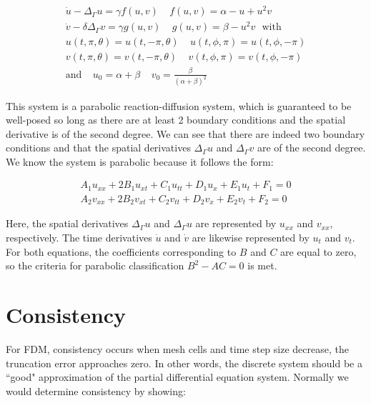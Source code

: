 \documentclass[12pt]{article}
\begin{document}
\begin{equation}
	\begin{aligned}
		\dot{u} - \Delta_\Gamma u = \gamma f(u,v) ~~~~~ f(u,v) = \alpha - u + u^2v ~~~\\
		\dot{v} - \delta\Delta_\Gamma v = \gamma g(u, v) ~~~~~ g(u, v) = \beta - u^2v ~~~ \text{with}\\
		u(t,\pi, \theta) = u(t, -\pi, \theta) ~~~~~ u(t, \phi, \pi) = u(t, \phi, -\pi) \\
		v(t,\pi, \theta) = v(t, -\pi, \theta) ~~~~~ v(t, \phi, \pi) = v(t, \phi, -\pi)	\\
		\text{and} ~~~~~ u_0 = \alpha + \beta ~~~~~ v_0 = \frac{\beta}{(\alpha+\beta)^2}~~~~~~
	\end{aligned}
\end{equation}

This system is a parabolic reaction-diffusion system, which is guaranteed to be well-posed so long as there are at least 2 boundary conditions and the spatial derivative is of the second degree. We can see that there are indeed two boundary conditions and that the spatial derivatives $\Delta_\Gamma u$ and $\Delta_\Gamma v$ are of the second degree. We know the system is parabolic because it follows the form:

\begin{equation}
	\begin{aligned}
		A_1u_{xx} + 2B_1u_{xt} + C_1u_{tt} + D_1u_x + E_1u_t + F_1 = 0 \\
		A_2v_{xx} + 2B_2v_{xt} + C_2v_{tt} + D_2v_x + E_2v_t + F_2 = 0
	\end{aligned}
\end{equation}

Here, the spatial derivatives $\Delta_\Gamma u$ and $\Delta_\Gamma u$ are represented by $u_{xx}$ and $v_{xx}$, respectively. The time derivatives $\dot{u}$ and $\dot{v}$ are likewise represented by $u_t$ and $v_t$. For both equations, the coefficients corresponding to $B$ and $C$ are equal to zero, so the criteria for parabolic classification $B^2-AC=0$ is met.


\section{Consistency}

For FDM, consistency occurs when mesh cells and time step size decrease, the truncation error approaches zero. In other words, the discrete system should be a ``good" approximation of the partial differential equation system. Normally we would determine consistency by showing:
\end{document}
